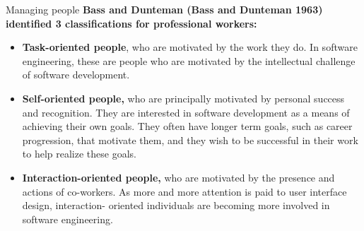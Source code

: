 \documentclass{beamer}
\begin{document}
\begin{frame}{Managing people}
	\textbf{Bass and Dunteman (Bass and Dunteman 1963) identified 3 
		classifications for professional workers:}
	\begin{itemize}
	\item \textbf{Task-oriented people}, who are motivated by the work they do. In software engineering, these are 
	people who are motivated by the intellectual challenge of software development.

	\item \textbf{Self-oriented people,} who are principally motivated by personal success and recognition. They are 
	interested in software development as a means of achieving their own goals. They often have longer term goals, such as career progression, that motivate them, and they wish to be successful in their 
	work to help realize these goals.
	\item \textbf{Interaction-oriented people,} who are motivated by the presence and actions of co-workers. As more 
	and more attention is paid to user interface design, interaction- oriented individuals are becoming 
	more involved in software engineering.

	\end{itemize}
\end{frame}
\end{document}
